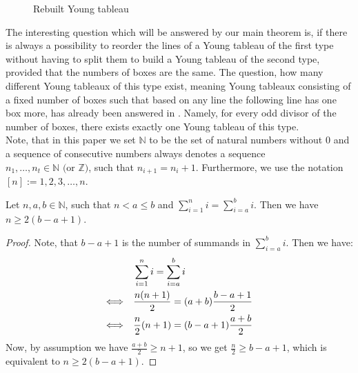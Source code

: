 \begin{figure}[ht]
\centering
{}
  \caption{Rebuilt Young tableau}
  \label{figure5:Figure 5}
\end{figure}

The interesting question which will be answered by our main theorem is, if there is always a possibility to reorder the lines of a Young tableau of the first type without having to split them to build a Young tableau of the second type, provided that the numbers of boxes are the same. The question, how many different Young tableaux of this type exist, meaning Young tableaux consisting of a fixed number of boxes such that based on any line the following line has one box more, has already been answered in \cite{5}. Namely, for every odd divisor of the number of boxes, there exists exactly one Young tableau of this type.\\
Note, that in this paper we set \(\mathbb{N}\) to be the set of natural numbers without \(0\) and a sequence of consecutive numbers always denotes a sequence\\
\(n_1,\ldots,n_t\in\mathbb{N}\text{ (or }\mathbb{Z})\), such that \(n_{i+1}=n_i+1\). Furthermore, we use the notation \([n]:=1,2,3,\ldots,n\).
\begin{lem}\label{lemma14}
Let \(n,a,b\in\mathbb{N}\), such that \(n<a\leq b\) and \(\sum\limits_{i=1}^ni=\sum\limits_{i=a}^bi\). Then we have \(n\geq 2(b-a+1)\).
\begin{proof}
Note, that \(b-a+1\) is the number of summands in \(\sum\limits_{i=a}^bi\). Then we have:
\begin{align}
&\sum\limits_{i=1}^ni=\sum\limits_{i=a}^bi\notag\\
\Longleftrightarrow\quad &\frac{n(n+1)}{2}=(a+b)\frac{b-a+1}{2}\notag\\
\Longleftrightarrow\quad &\frac{n}{2}(n+1)=(b-a+1)\frac{a+b}{2}\notag
\end{align}
Now, by assumption we have \(\frac{a+b}{2}\geq n+1\), so we get \(\frac{n}{2}\geq b-a+1\), which is equivalent to \(n\geq 2(b-a+1)\).
\end{proof}
\end{lem}

